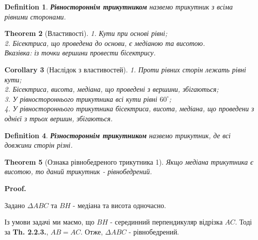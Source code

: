 \documentclass[a4paper, 10pt]{article}
\makeatletter
\def\qed{$\blacksquare$}
\theoremstyle{theoremdd}
\newtheorem{theorem}{Theorem}[subsection]
\theoremstyle{theoremdd}
\theoremstyle{theoremdd}
\newtheorem{definition}[theorem]{Definition}
\theoremstyle{theoremdd}
\theoremstyle{theoremdd}
\theoremstyle{theoremdd}
\theoremstyle{theoremdd}
\theoremstyle{theoremdd}
\theoremstyle{theoremdd}
\newtheorem{corollary}[theorem]{Corollary}
\renewenvironment{proof}[1][Proof.\\]{\par
\pushQED{\hfill \qed}%
\normalfont \topsep6\p@\@plus6\p@\relax
\trivlist
\item\relax
{\bfseries
#1\@addpunct{.}}\hspace\labelsep\ignorespaces
}{%
\popQED\endtrivlist\@endpefalse
}
\makeatother
\begin{document}
\begin{definition}
\textbf{Рівностороннім трикутником} назвемо трикутник з всіма рівними сторонами.
\end{definition}

\begin{theorem}[Властивості]
1. Кути при основі рівні;\\
2. Бісектриса, що проведена до основи, є медіаною та висотою.\\
\textit{Вказівка: із точки вершини провести бісектрису.}
\end{theorem}

\begin{corollary}[Наслідок з властивостей]
1. Проти рівних сторін лежать рівні кути;\\
2. Бісектриса, висота, медіана, що проведені з вершини, збігаються;\\
3. У рівностороннього трикутника всі кути рівні $60^\circ$;\\
4. У рівностороннього трикутника бісектриса, висота, медіана, що проведени з однієї з трьох вершин, збігаються.
\end{corollary}

\begin{definition}
\textbf{Різностороннім трикутником} назвемо трикутник, де всі довжини сторін різні.
\end{definition}

\begin{theorem}[Ознака рівнобедреного трикутника 1]
Якщо медіана трикутника є висотою, то даний трикутник - рівнобедрений.
\end{theorem}

\begin{proof}
Задано $\Delta ABC$ та $BH$ - медіана та висота одночасно.
\begin{figure}[H]
\centering
{}
\end{figure}
Із умови задачі ми маємо, що $BH$ - серединний перпендикуляр відрізка $AC$. Тоді за \textbf{Th. 2.2.3.}, $AB = AC$. Отже, $\Delta ABC$ - рівнобедрений.
\end{proof}
\end{document}
